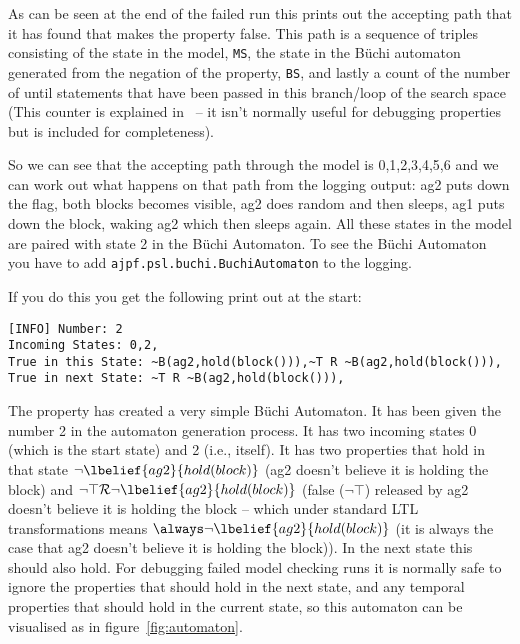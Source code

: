 As can be seen at the end of the failed run this prints out the accepting path that it has found that makes the property false.  This path is a sequence of triples consisting of the state in the model, \texttt{MS}, the state in the B\"{u}chi automaton generated from the negation of the property, \texttt{BS}, and lastly a count of the number of until statements that have been passed in this branch/loop of the search space (This counter is explained in~\cite{Gerth:1995:SOA:645837.670574} -- it isn't normally useful for debugging properties but is included for completeness).

So we can see that the accepting path through the model is 0,1,2,3,4,5,6 and we can work out what happens on that path from the logging output: ag2 puts down the flag, both blocks becomes visible, ag2 does random and then sleeps, ag1 puts down the block, waking ag2 which then sleeps again.  All these states in the model are paired with state 2 in the B\"{u}chi Automaton.  To see the B\"{u}chi Automaton you have to add \texttt{ajpf.psl.buchi.BuchiAutomaton} to the logging.

If you do this you get the following print out at the start:

\begin{verbatim}
[INFO] Number: 2
Incoming States: 0,2,
True in this State: ~B(ag2,hold(block())),~T R ~B(ag2,hold(block())),
True in next State: ~T R ~B(ag2,hold(block())),
\end{verbatim}

The property has created a very simple B\"{u}chi Automaton.  It has been given the number 2 in the automaton generation process.  It has two incoming states 0 (which is the start state) and 2 (i.e., itself).  It has two properties that hold in that state $\neg \lbelief{ag2}{hold(block)}$ (ag2 doesn't believe it is holding the block) and $\neg \top {\cal R} \neg \lbelief{ag2}{hold(block)}$ (false ($\neg \top$) released by ag2 doesn't believe it is holding the block -- which under standard LTL transformations means $\always \neg \lbelief{ag2}{hold(block)}$ (it is always the case that ag2 doesn't believe it is holding the block)).  In the next state this should also hold.  For debugging failed model checking runs it is normally safe to ignore the properties that should hold in the next state, and any temporal properties that should hold in the current state, so this automaton can be visualised as in figure~\ref{fig:automaton}.


